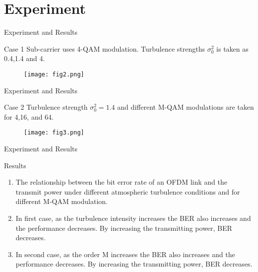 \documentclass{beamer}
\begin{document}
\section{Experiment}
\begin{frame}{Experiment and Results}
    \begin{block}{Case 1}
Sub-carrier uses 4-QAM modulation. Turbulence strengths $\sigma_0^2$ is taken as 0.4,1.4 and 4.
\begin{figure}
    \centering
    \texttt{[image: fig2.png]}
    \caption{}
    \label{fig:fig2_lab}
\end{figure}
    \end{block}
\end{frame}

\begin{frame}{Experiment and Results}
    \begin{block}{Case 2}
Turbulence strength $\sigma_0^2 = 1.4$ and different M-QAM modulations are taken for 4,16, and 64. 
\begin{figure}
    \centering
    \texttt{[image: fig3.png]}
    \caption{}
    \label{fig:fig2_lab}
\end{figure}
    \end{block}
\end{frame}
\begin{frame}{Experiment and Results}
\begin{block}{Results}
\begin{enumerate}
\item The relationship between the bit error rate of an OFDM link and the transmit power under different atmospheric turbulence conditions and for different M-QAM modulation.
    \item In first case, as the turbulence intensity increases the BER also increases and the performance decreases. By increasing the transmitting power, BER decreases.
    \item In second case, as the order M increases the BER also increases and the performance decreases. By increasing the transmitting power, BER decreases.
\end{enumerate}
\end{block}
    
\end{frame}
\end{document}
